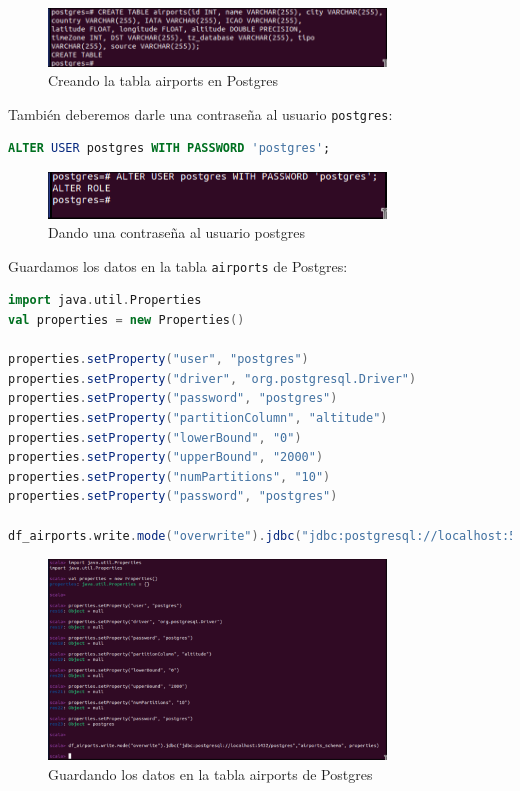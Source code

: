 \begin{figure}[H]
    \centering
    \includegraphics[width=0.8\textwidth]{figures/47.png}
    \caption{Creando la tabla airports en Postgres}
    \label{fig:create_airports_table}
\end{figure}

También deberemos darle una contraseña al usuario \texttt{postgres}:

\begin{lstlisting}[language=sql]
ALTER USER postgres WITH PASSWORD 'postgres';
\end{lstlisting}

\begin{figure}[H]
    \centering
    \includegraphics[width=0.8\textwidth]{figures/48.png}
    \caption{Dando una contraseña al usuario postgres}
    \label{fig:postgres_password}
\end{figure}

Guardamos los datos en la tabla \texttt{airports} de Postgres:

\begin{lstlisting}[language=scala]
import java.util.Properties
val properties = new Properties()

properties.setProperty("user", "postgres")
properties.setProperty("driver", "org.postgresql.Driver")
properties.setProperty("password", "postgres")
properties.setProperty("partitionColumn", "altitude")
properties.setProperty("lowerBound", "0")
properties.setProperty("upperBound", "2000")
properties.setProperty("numPartitions", "10")
properties.setProperty("password", "postgres")

df_airports.write.mode("overwrite").jdbc("jdbc:postgresql://localhost:5432/postgres", "airports", properties)
\end{lstlisting}

\begin{figure}[H]
    \centering
    \includegraphics[width=0.8\textwidth]{figures/49.png}
    \caption{Guardando los datos en la tabla airports de Postgres}
    \label{fig:save_airports_postgres}
\end{figure}

